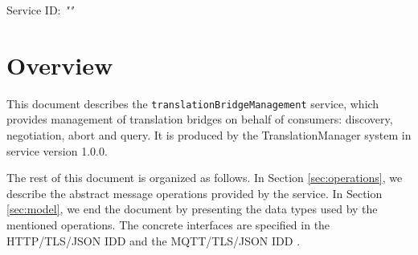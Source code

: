 \documentclass[a4paper]{arrowhead}
\begin{document}
\sloppy

\ArrowheadSetup

\begin{center}
  \vspace*{1cm}
  \huge{\arrowtitle}

  \vspace*{0.2cm}
  \LARGE{\arrowtype}
  \vspace*{1cm}

  \Large{Service ID: \textit{"\arrowid"}}

  \vspace*{\fill}


  \vspace*{1cm}
  \vspace*{\fill}

  \begin{abstract}
    This document describes the \texttt{translation\allowbreak{}Bridge\allowbreak{}Management} service, version 1.0.0, produced by the TranslationManager support system of Arrowhead 5.2.2.
  \end{abstract}

  \vspace*{1cm}
\end{center}

\newpage

\tableofcontents
\newpage

\section{Overview}
\label{sec:overview}

This document describes the \texttt{translation\allowbreak{}Bridge\allowbreak{}Management} service, which provides management of translation bridges on behalf of consumers: discovery, negotiation, abort and query.
It is produced by the TranslationManager system \cite{tm-sysd} in service version 1.0.0.

The rest of this document is organized as follows.
In Section \ref{sec:operations}, we describe the abstract message operations provided by the service.
In Section \ref{sec:model}, we end the document by presenting the data types used by the mentioned operations.
The concrete interfaces are specified in the HTTP/TLS/JSON IDD \cite{tm-translationBridgeManagement-http-idd} and the MQTT/TLS/JSON IDD \cite{tm-translationBridgeManagement-mqtt-idd}.
\end{document}
